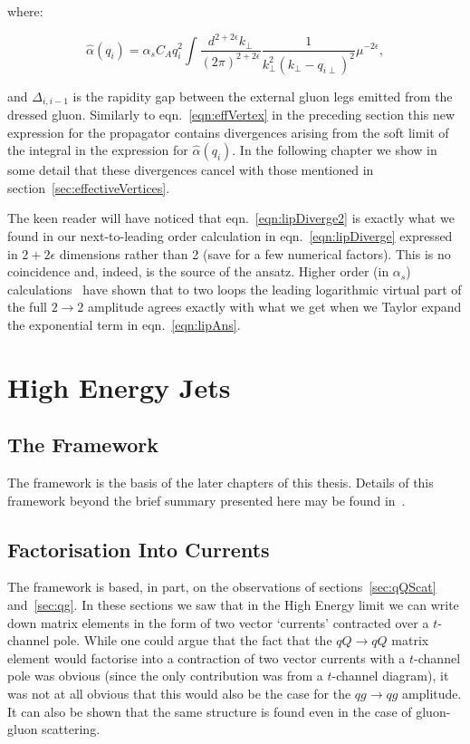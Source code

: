 	where:

	\begin{equation}
		\hat{\alpha}(q_i) = \alpha_sC_Aq_i^2\int \frac{d^{2+2\epsilon}k_{\perp}}{(2\pi)^{2+2\epsilon}}
		\frac{1}{k^2_\perp(k_\perp - q_{i\perp})^2}\mu^{-2\epsilon},
		\label{eqn:lipDiverge2}
	\end{equation}

	and $\Delta_{i,i-1}$ is the rapidity gap between the external gluon legs emitted from
	the dressed gluon.  Similarly to eqn.~\eqref{eqn:effVertex} in the preceding section this
	new expression for the propagator contains divergences arising from the soft limit
	of the integral in the expression for $\hat{\alpha}(q_i)$.  In the following chapter we
	show in some detail that these divergences cancel with those mentioned in
	section~\ref{sec:effectiveVertices}.

	The keen reader will have noticed that eqn.~\eqref{eqn:lipDiverge2} is exactly what we
	found in our next-to-leading order calculation in eqn.~\eqref{eqn:lipDiverge} expressed
	in $2+2\epsilon$ dimensions rather than 2 (save for a few numerical factors).  This is
	no coincidence and, indeed, is the source of the ansatz.  Higher
	order (in $\alpha_s$) calculations~\cite{DelDuca:1995hf,9780511524387} have shown that to
	two loops the leading logarithmic virtual part of the full $2\to2$ amplitude agrees exactly with what
	we get when we Taylor expand the exponential term in eqn.~\eqref{eqn:lipAns}.

\section{High Energy Jets}
	\label{sec:HEJ}

	\subsection{The \hej Framework}

	The \hej framework is the basis of the later chapters of this thesis.  Details of this framework
	beyond the brief summary presented here may be found in~\cite{ZPaper,Andersen:2009nu,Andersen:2009he,
	Andersen:2011hs,Andersen:2012gk}.

	\subsection{Factorisation Into Currents}
	\label{sec:currents}

		The \hej framework is based, in part, on the observations of sections~\eqref{sec:qQScat}
		and~\eqref{sec:qg}.  In these sections we saw that in the High Energy limit we can write down
		matrix elements in the form of two vector `currents' contracted over a $t$-channel pole.  While
		one could argue that the fact that the $qQ\to qQ$ matrix element would factorise into a contraction
		of two vector currents with a $t$-channel pole was obvious (since the only contribution was
		from a $t$-channel diagram), it was not at all obvious that this would also be the case for the
		$qg\to qg$ amplitude.  It can also be shown that the same structure is found even in the case of
		gluon-gluon scattering\cite{Andersen:2011hs}.

